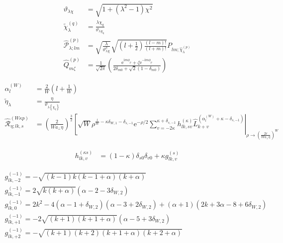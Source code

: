 \begin{align*}
    \vartheta_{\lambda\chi}
    & =
    \sqrt{1 + \left(\lambda^2-1\right)\chi^2}
    \\
    \tilde{\chi}_{\lambda}^{\left(q\right)}
    & =
    \frac{\lambda\chi_{q}}{\vartheta_{\lambda\chi_{q}}}
    \\
    \hat{\mathcal{P}}_{\lambda;lm}^{(p)}
    & = 
    \sqrt{\frac{ \lambda }{ \vartheta_{\lambda\chi}^{3} }}
    \sqrt{
        \left(l+\frac{1}{2}\right)
        \frac{ \left(l-m\right)! }{ \left(l+m\right)! }
    }
    P_{lm;\hat{\chi}_{\lambda}^{\left(p\right)}}
    \\
    \hat{Q}_{m\zeta}^{(p)}
    & = 
    \frac{1}{\sqrt{2\pi}}
    \left(
        \frac
        {
            \mathrm{e}^{\mathrm{i}m \phi_{p}}
            +
            \zeta\mathrm{e}^{-\mathrm{i}m \phi_{p}}
        }
        {2\delta_{m0} + \sqrt{2}\left(1-\delta_{m0}\right)}
    \right)
\end{align*}


\begin{align*}
    \alpha_{l}^{\left(W\right)}
    & =
    \frac{2}{W}\left(l+\frac{1}{W}\right)
    \\
    \tilde{\eta}_{\lambda}
    & =
    \frac{ \eta }{ \vartheta_{\lambda\left\{\chi_{q}\right\}} }
    \\
    \hat{\mathcal{R}}_{\eta;lk,s}^{(W\kappa p)}
    & =
    \left(
        \frac{2}{Wa_{\perp}\eta}
    \right)^{\frac{3}{2}}
    \left[
        \sqrt{W}
        \rho^{\frac{l}{W}-\kappa\delta_{W,1}-\delta_{s,-1}}\mathrm{e}^{-\rho/2}
        \sum_{v=-2\kappa}^{\kappa+\delta_{s,-1}}
        h_{lk,sv}^{(\kappa)}
        \hat{L}_{k+v}^{\left(
            \alpha_{l}^{\left(W\right)}+\kappa-\delta_{s,-1}
        \right)}
    \right|_{
        \rho
        \rightarrow 
        \left(
            \frac{2r}{Wa_{\perp}\eta}
        \right)^{W}
    }
\end{align*}

\begin{align*}
    h_{lk,v}^{(\kappa s)}
    & =
    \left(1-\kappa\right)\delta_{s0}\delta_{v0} + \kappa g_{lk,v}^{(s)}
\end{align*}

\begin{gather*}
    g_{lk,-2}^{(-1)}
    =
    -\sqrt{(k-1)k(k-1+\alpha)(k+\alpha)}
    \\
    g_{lk,-1}^{(-1)}
    =
    2\sqrt{k(k+\alpha)}\left(\alpha-2-3\delta_{W,2}\right)
    \\
    g_{lk,0}^{(-1)}
    =
    2k^{2}
    -
    4\left(\alpha-1+\delta_{W,2}\right)\left(\alpha-3+2\delta_{W,2}\right)
    +
    \left(\alpha+1\right)\left(2k+3\alpha-8+6\delta_{W,2}\right)
    \\
    g_{lk,+1}^{(-1)}
    =
    -2\sqrt{(k+1)(k+1+\alpha)}\left(\alpha-5+3\delta_{W,2}\right)
    \\
    g_{lk,+2}^{(-1)}
    =
    -\sqrt{(k+1)(k+2)(k+1+\alpha)(k+2+\alpha)}
\end{gather*}

